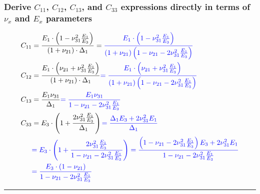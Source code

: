\documentclass{article}
\begin{document}
\subsubsection{Derive $C_{11}$, $C_{12}$, $C_{13}$, and $C_{33}$ expressions directly in terms of $\nu_x$ and $E_x$ parameters}

\begin{align}
C_{11}
&=\frac{E_1 \cdot \left( 1-\nu_{31}^2 \frac{E_1}{E_3} \right)}{ \left(1+\nu_{21}\right) \cdot \Delta_1} = \textcolor{blue}{\frac{E_1 \cdot \left( 1-\nu_{31}^2 \frac{E_1}{E_3} \right)}{ \left(1+\nu_{21}\right) \left( 1-\nu_{21}-2\nu_{31}^2\frac{E_1}{E_3} \right) }} \\
C_{12} 
&=\frac{E_1 \cdot \left( \nu_{21}+\nu_{31}^2 \frac{E_1}{E_3} \right)}{ \left(1+\nu_{21}\right) \cdot \Delta_1} \textcolor{blue}{=\frac{E_1 \cdot \left( \nu_{21}+\nu_{31}^2 \frac{E_1}{E_3} \right)}{ \left(1+\nu_{21}\right)  \left( 1-\nu_{21}-2\nu_{31}^2\frac{E_1}{E_3} \right) }} \\
C_{13}
&=\frac{E_1 \nu_{31}}{ \Delta_1} \textcolor{blue}{=\frac{E_1 \nu_{31}}{ 1-\nu_{21}-2\nu_{31}^2\frac{E_1}{E_3} } }   \\
C_{33}
&=E_3 \cdot \left( 1 + \frac{  2\nu_{31}^2 \frac{E_1}{E_3}}{\Delta_1} \right)
\textcolor{blue}{ =\frac{ \Delta_1 E_3 + 2\nu_{31}^2 E_1}{\Delta_1} }  \\
& \textcolor{blue}{ =E_3 \cdot \left( 1 + \frac{  2\nu_{31}^2 \frac{E_1}{E_3}}{ 1-\nu_{21}-2\nu_{31}^2\frac{E_1}{E_3} } \right) = \frac{ \left( 1-\nu_{21}-2\nu_{31}^2\frac{E_1}{E_3} \right) E_3 + 2 \nu_{31}^2 E_1}{ 1-\nu_{21}-2\nu_{31}^2\frac{E_1}{E_3} } }  \\
& \textcolor{blue}{= \frac{ E_3 \cdot \left( 1-\nu_{21} \right) }{ 1-\nu_{21}-2\nu_{31}^2\frac{E_1}{E_3} } }  \\
\end{align}
\noindent\rule{8cm}{0.4pt}
\end{document}
